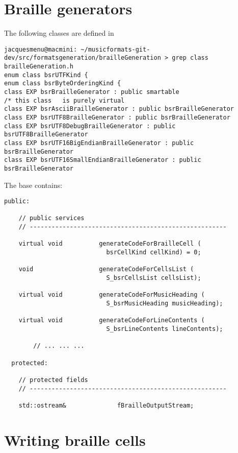\section{Braille generators}

The following classes are defined in 
\begin{lstlisting}[language=Terminal]
jacquesmenu@macmini: ~/musicformats-git-dev/src/formatsgeneration/brailleGeneration > grep class   brailleGeneration.h
enum class bsrUTFKind {
enum class bsrByteOrderingKind {
class EXP bsrBrailleGenerator : public smartable
/* this class   is purely virtual
class EXP bsrAsciiBrailleGenerator : public bsrBrailleGenerator
class EXP bsrUTF8BrailleGenerator : public bsrBrailleGenerator
class EXP bsrUTF8DebugBrailleGenerator : public bsrUTF8BrailleGenerator
class EXP bsrUTF16BigEndianBrailleGenerator : public bsrBrailleGenerator
class EXP bsrUTF16SmallEndianBrailleGenerator : public bsrBrailleGenerator
\end{lstlisting}

The base  contains:
\begin{lstlisting}[language=CPlusPlus]
  public:

    // public services
    // ------------------------------------------------------

    virtual void          generateCodeForBrailleCell (
                            bsrCellKind cellKind) = 0;

    void                  generateCodeForCellsList (
                            S_bsrCellsList cellsList);

    virtual void          generateCodeForMusicHeading (
                            S_bsrMusicHeading musicHeading);

    virtual void          generateCodeForLineContents (
                            S_bsrLineContents lineContents);

		// ... ... ...

  protected:

    // protected fields
    // ------------------------------------------------------

    std::ostream&              fBrailleOutputStream;
\end{lstlisting}


\section{Writing braille cells}

